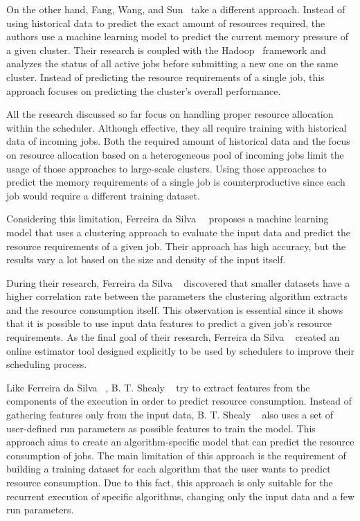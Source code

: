 On the other hand, Fang, Wang, and Sun~\cite{fang2018} take a different approach.
Instead of using historical data to predict the exact amount of resources required, the authors use a machine learning model to predict the current memory pressure of a given cluster.
Their research is coupled with the Hadoop~\cite{hadoop} framework and analyzes the status of all active jobs before submitting a new one on the same cluster.
Instead of predicting the resource requirements of a single job, this approach focuses on predicting the cluster's overall performance.

All the research discussed so far focus on handling proper resource allocation within the scheduler.
Although effective, they all require training with historical data of incoming jobs.
Both the required amount of historical data and the focus on resource allocation based on a heterogeneous pool of incoming jobs limit the usage of those approaches to large-scale clusters.
Using those approaches to predict the memory requirements of a single job is counterproductive since each job would require a different training dataset.

Considering this limitation, Ferreira da Silva~\etal~\cite{ferreira2013} proposes a machine learning model that uses a clustering approach to evaluate the input data and predict the resource requirements of a given job.
Their approach has high accuracy, but the results vary a lot based on the size and density of the input itself.

During their research, Ferreira da Silva \etal~\cite{ferreira2013} discovered that smaller datasets have a higher correlation rate between the parameters the clustering algorithm extracts and the resource consumption itself.
This observation is essential since it shows that it is possible to use input data features to predict a given job's resource requirements.
As the final goal of their research, Ferreira da Silva \etal~\cite{ferreira2013} created an online estimator tool designed explicitly to be used by schedulers to improve their scheduling process.

Like Ferreira da Silva \etal~\cite{ferreira2013}, B. T. Shealy \etal~\cite{shealy2021} try to extract features from the components of the execution in order to predict resource consumption.
Instead of gathering features only from the input data, B. T. Shealy \etal~\cite{shealy2021} also uses a set of user-defined run parameters as possible features to train the model.
This approach aims to create an algorithm-specific model that can predict the resource consumption of jobs.
The main limitation of this approach is the requirement of building a training dataset for each algorithm that the user wants to predict resource consumption.
Due to this fact, this approach is only suitable for the recurrent execution of specific algorithms, changing only the input data and a few run parameters.


